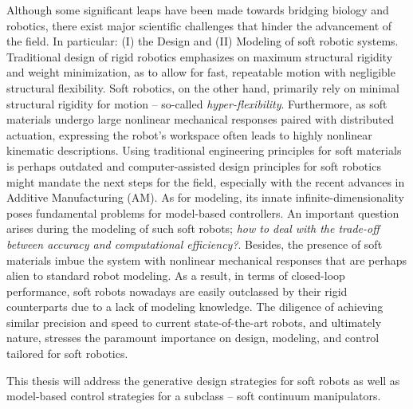 \par Although some significant leaps have been made towards bridging biology and robotics, there exist major scientific challenges that hinder the advancement of the field. In particular: (I) the Design and (II) Modeling of soft robotic systems. Traditional design of rigid robotics emphasizes on maximum structural rigidity and weight minimization, as to allow for fast, repeatable motion with negligible structural flexibility. Soft robotics, on the other hand, primarily rely on minimal structural rigidity for motion -- so-called \emph{hyper-flexibility}. Furthermore, as soft materials undergo large nonlinear mechanical responses paired with distributed actuation, expressing the robot's workspace often leads to highly nonlinear kinematic descriptions. Using traditional engineering principles for soft materials is perhaps outdated and computer-assisted design principles for soft robotics might mandate the next steps for the field, especially with the recent advances in Additive Manufacturing (AM).
As for modeling, its innate infinite-dimensionality poses fundamental problems for model-based controllers. An important question arises during the modeling of such soft robots; \emph{how to deal with the trade-off between accuracy and computational efficiency?}. Besides, the presence of soft materials imbue the system with nonlinear mechanical responses that are perhaps alien to standard robot modeling. As a result, in terms of closed-loop performance, soft robots nowadays are easily outclassed by their rigid counterparts due to a lack of modeling knowledge. The diligence of achieving similar precision and speed to current state-of-the-art robots, and ultimately nature, stresses the paramount importance on design, modeling, and control tailored for soft robotics.

\par This thesis will address the generative design strategies for soft robots as well as model-based control strategies for a subclass  -- soft continuum manipulators.

